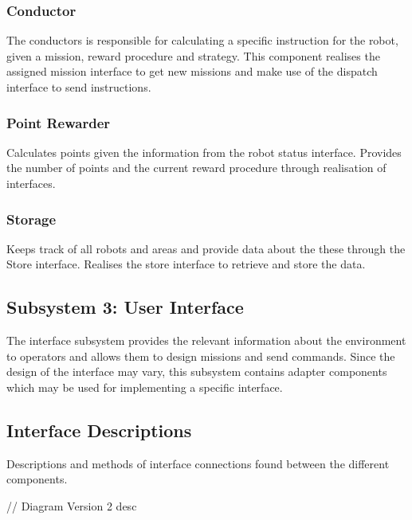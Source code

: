 \subsubsection*{Conductor}
The conductors is responsible for calculating a specific instruction for the robot, given a mission, reward procedure and strategy. This component realises the assigned mission interface to get new missions and make use of the dispatch interface to send instructions.
\subsubsection*{Point Rewarder}
Calculates points given the information from the robot status interface. Provides the number of points and the current reward procedure through realisation of interfaces.
\subsubsection*{Storage}
Keeps track of all robots and areas and provide data about the these through the Store interface. Realises the store interface to retrieve and store the data.

\subsection*{Subsystem 3: User Interface}
The interface subsystem provides the relevant information about the environment to operators and allows them to design missions and send commands. Since the design of the interface may vary, this subsystem contains adapter components which may be used for implementing a specific interface.

\subsection*{Interface Descriptions}
Descriptions and methods of interface connections found between the different components.

// Diagram Version 2 desc
